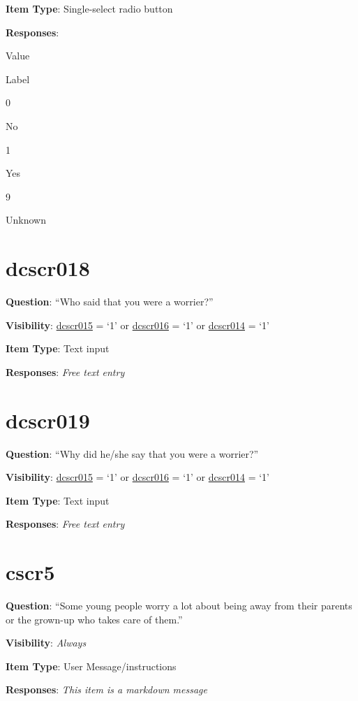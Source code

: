 \documentclass[]{book}
\begin{document}
\textbf{Item Type}: Single-select radio button

\textbf{Responses}:

Value

Label

0

No

1

Yes

9

Unknown

\hypertarget{dcscr018}{%
\section{dcscr018}\label{dcscr018}}

\textbf{Question}: ``Who said that you were a worrier?''

\textbf{Visibility}: \protect\hyperlink{dcscr015}{dcscr015} = `1' or \protect\hyperlink{dcscr016}{dcscr016} = `1' or \protect\hyperlink{dcscr014}{dcscr014} = `1'

\textbf{Item Type}: Text input

\textbf{Responses}: \emph{Free text entry}

\hypertarget{dcscr019}{%
\section{dcscr019}\label{dcscr019}}

\textbf{Question}: ``Why did he/she say that you were a worrier?''

\textbf{Visibility}: \protect\hyperlink{dcscr015}{dcscr015} = `1' or \protect\hyperlink{dcscr016}{dcscr016} = `1' or \protect\hyperlink{dcscr014}{dcscr014} = `1'

\textbf{Item Type}: Text input

\textbf{Responses}: \emph{Free text entry}

\hypertarget{cscr5}{%
\section{cscr5}\label{cscr5}}

\textbf{Question}: ``Some young people worry a lot about being away from their parents or the grown-up who takes care of them.''

\textbf{Visibility}: \emph{Always}

\textbf{Item Type}: User Message/instructions

\textbf{Responses}: \emph{This item is a markdown message}
\end{document}
